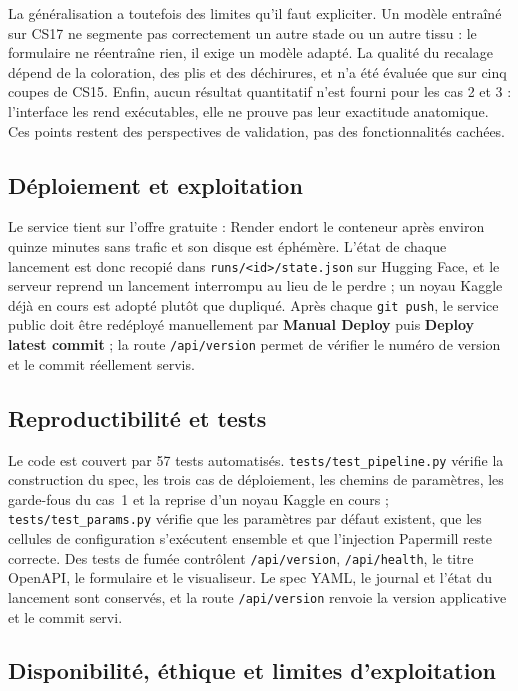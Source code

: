 \documentclass[12pt,a4paper]{report}
\begin{document}
La généralisation a toutefois des limites qu'il faut expliciter. Un modèle entraîné sur CS17 ne segmente pas correctement un autre stade ou un autre tissu : le formulaire ne réentraîne rien, il exige un modèle adapté. La qualité du recalage dépend de la coloration, des plis et des déchirures, et n'a été évaluée que sur cinq coupes de CS15. Enfin, aucun résultat quantitatif n'est fourni pour les cas 2 et 3 : l'interface les rend exécutables, elle ne prouve pas leur exactitude anatomique. Ces points restent des perspectives de validation, pas des fonctionnalités cachées.

\subsection{Déploiement et exploitation}

Le service tient sur l'offre gratuite : Render endort le conteneur après environ quinze minutes sans trafic et son disque est éphémère. L'état de chaque lancement est donc recopié dans \texttt{runs/<id>/state.json} sur Hugging Face, et le serveur reprend un lancement interrompu au lieu de le perdre ; un noyau Kaggle déjà en cours est adopté plutôt que dupliqué. Après chaque \texttt{git push}, le service public doit être redéployé manuellement par \textbf{Manual Deploy} puis \textbf{Deploy latest commit} ; la route \texttt{/api/version} permet de vérifier le numéro de version et le commit réellement servis.

\subsection{Reproductibilité et tests}

Le code est couvert par 57 tests automatisés. \texttt{tests/test\_pipeline.py} vérifie la construction du spec, les trois cas de déploiement, les chemins de paramètres, les garde-fous du cas~1 et la reprise d'un noyau Kaggle en cours ; \texttt{tests/test\_params.py} vérifie que les paramètres par défaut existent, que les cellules de configuration s'exécutent ensemble et que l'injection Papermill reste correcte. Des tests de fumée contrôlent \texttt{/api/version}, \texttt{/api/health}, le titre OpenAPI, le formulaire et le visualiseur. Le spec YAML, le journal et l'état du lancement sont conservés, et la route \texttt{/api/version} renvoie la version applicative et le commit servi.

\subsection{Disponibilité, éthique et limites d'exploitation}
\end{document}
